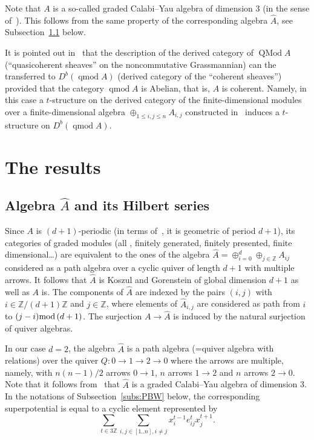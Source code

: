 \documentclass{amsart}
\numberwithin{equation}{section}
\theoremstyle{plain}
\theoremstyle{definition}
\begin{document}
Note that $A$ is a so-called graded Calabi--Yau algebra
of dimension 3 (in the sense of~\cite{bock}). 
This follows from the same property of the corresponding algebra $\hat A$,
see Subsection~\ref{subs: hat A} below. 

 It is pointed out
in~\cite[Remark~8.23]{elo} that the description of the derived
category of ${\mathop{\mathrm{QMod}}\nolimits} A$ (``quasicoherent sheaves'' on the
noncommutative Grassmannian) can the transferred to $D^b({\mathop{\mathrm{qmod}}\nolimits} A)$
(derived category of the ``coherent sheaves'') provided that the
category ${\mathop{\mathrm{qmod}}\nolimits} A$ is Abelian, that is, $A$ is coherent. 
Namely, 
in this case a $t$-structure on the derived 
category of the finite-dimensional modules over a finite-dimensional algebra 
$\oplus_{1\le i,j \le n} A_{i,j}$ constructed in~\cite[Section~8]{elo} induces a $t$-structure 
on $D^b({\mathop{\mathrm{qmod}}\nolimits} A)$. 

\section{The results}

\subsection{Algebra $\hat A$ and its Hilbert series}

\label{subs: hat A}

Since $A$ is $(d+1)$-periodic (in terms of~\cite[Section~4]{bp}, it is geometric of period $d+1$),
 its categories of graded modules
(all , finitely generated, finitely presented, finite
dimensional\dots) are equivalent to the ones of the algebra 
$\hat
A = \oplus_{i=0}^d \oplus_{j\in {\ensuremath{\mathbb Z}}} A_{ij}$ considered as a path
algebra over a cyclic quiver of length $d+1$  with multiple arrows. 
It follows that $\hat A$ is Koszul and Gorenstein of
global dimension $d+1$ as well as $A$ is. The components of $\hat A$ are
indexed by the pairs $(i,j)$ with $i \in {\ensuremath{\mathbb Z}}/ (d+1){\ensuremath{\mathbb Z}} $ and $j\in
{\ensuremath{\mathbb Z}}$, where elements of $\hat A_{i,j}$ are considered as path from
$i$ to $(j-i) {\mbox{mod\,}} (d+1)$. The surjection $A\to \hat A$ is induced by the
natural surjection of  quiver algebras.

In our case $d=2$, the algebra $\hat A$ is a path algebra (=quiver algebra with relations) over
the quiver $Q:0\to 1\to 2\to 0$ where the arrows are multiple,
namely, with $n(n-1)/2$ arrows   $0\to 1$, $n$ arrows $1\to 2$ and $n$
arrows $2\to 0$. 
 Note that it follows from~\cite[Theorem~3.1]{bock} that 
 $\hat A$ is a graded Calabi--Yau algebra of dimension 3.  
 In 
the notations of Subsection~\ref{subs:PBW} below, the corresponding superpotential is equal to a cyclic element represented by 
$$
\sum_{t\in 3{\ensuremath{\mathbb Z}}} \sum_{i,j\in [1..n], i\ne j} x^{t-1}_i e^t_{ij} x^{t+1}_j .
$$
\end{document}
